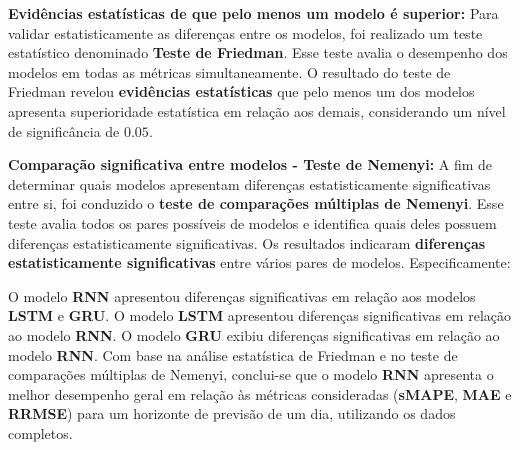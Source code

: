 \noindent\textbf{Evidências estatísticas de que pelo menos um modelo é superior:}
Para validar estatisticamente as diferenças entre os modelos, foi realizado um teste estatístico denominado \textbf{Teste de Friedman}. Esse teste avalia o desempenho dos modelos em todas as métricas simultaneamente. O resultado do teste de Friedman revelou \textbf{evidências estatísticas} que pelo menos um dos modelos apresenta superioridade estatística em relação aos demais, considerando um nível de significância de $0.05$.
	
\noindent\textbf{Comparação significativa entre modelos - Teste de Nemenyi:}	
A fim de determinar quais modelos apresentam diferenças estatisticamente significativas entre si, foi conduzido o \textbf{teste de comparações múltiplas de Nemenyi}. Esse teste avalia todos os pares possíveis de modelos e identifica quais deles possuem diferenças estatisticamente significativas. Os resultados indicaram \textbf{diferenças estatisticamente significativas} entre vários pares de modelos. Especificamente:

O modelo \textbf{RNN} apresentou diferenças significativas em relação aos modelos \textbf{LSTM} e \textbf{GRU}.
O modelo \textbf{LSTM} apresentou diferenças significativas em relação ao modelo \textbf{RNN}.
O modelo \textbf{GRU} exibiu diferenças significativas em relação ao modelo \textbf{RNN}.
Com base na análise estatística de Friedman e no teste de comparações múltiplas de Nemenyi, conclui-se que o modelo \textbf{RNN} apresenta o melhor desempenho geral em relação às métricas consideradas (\textbf{sMAPE}, \textbf{MAE} e \textbf{RRMSE}) para um horizonte de previsão de um dia, utilizando os dados completos.


